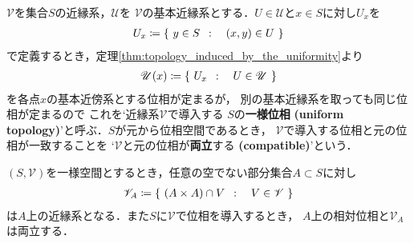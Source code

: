 	\begin{screen}
		\begin{dfn}[一様位相]
			$\mathscr{V}$を集合$S$の近縁系，$\mathscr{U}$を
			$\mathscr{V}$の基本近縁系とする．$U \in \mathscr{U}$と$x \in S$に対し$U_x$を
			\begin{align}
				U_x \coloneqq \left\{\ y \in S\ \, : \quad (x,y) \in U\ \right\}
			\end{align}
			で定義するとき，定理\ref{thm:topology_induced_by_the_uniformity}より
			\begin{align}
				\mathscr{U}(x) \coloneqq \left\{\ U_x\ \, : \quad U \in \mathscr{U}\ \right\}
			\end{align}
			を各点$x$の基本近傍系とする位相が定まるが，
			別の基本近縁系を取っても同じ位相が定まるので
			これを`近縁系$\mathscr{V}$で導入する
			$S$の{\bf 一様位相}
			{\bf (uniform topology)}'と呼ぶ．$S$が元から位相空間であるとき，
			$\mathscr{V}$で導入する位相と元の位相が一致することを
			`$\mathscr{V}$と元の位相が{\bf 両立}する
			{\bf (compatible)}'という．
		\end{dfn}
	\end{screen}
	
	\begin{screen}
		\begin{thm}[部分一様空間]
			$(S,\mathscr{V})$を一様空間とするとき，任意の空でない部分集合$A \subset S$に対し
			\begin{align}
				\mathscr{V}_A \coloneqq 
				\left\{\ (A \times A) \cap V\ \, : \quad V \in \mathscr{V}\ \right\}
			\end{align}
			は$A$上の近縁系となる．また$S$に$\mathscr{V}$で位相を導入するとき，
			$A$上の相対位相と$\mathscr{V}_A$は両立する．
		\end{thm}
	\end{screen}
	
